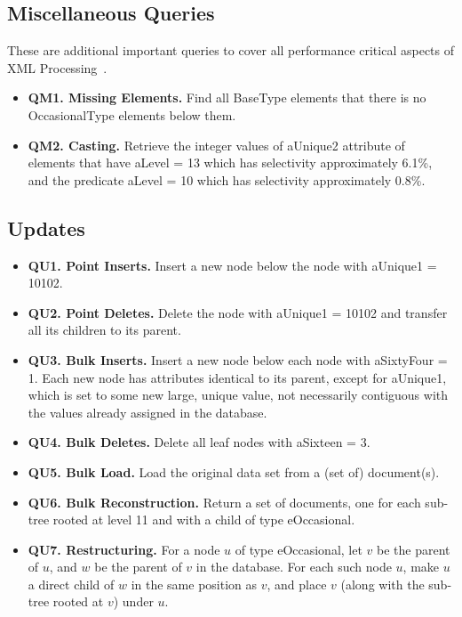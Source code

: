 \subsection{Miscellaneous Queries}
These are additional important queries to cover all performance
critical aspects of XML Processing~\cite{SIGMODRECORD01Bench}.
\begin {itemize}
\item {\bf QM1. Missing Elements.} Find all {\sf BaseType} elements that
there is no {\sf OccasionalType} elements below them.
\item {\bf QM2. Casting.} Retrieve the integer values of {\sf aUnique2}
attribute of elements that have {\sf aLevel = 13} which has selectivity
approximately 6.1\%, and the predicate {\sf aLevel = 10} which has
selectivity approximately 0.8\%.
\end{itemize}

\subsection{Updates}
\begin {itemize}
\item {\bf QU1. Point Inserts.} Insert a new node below the node with
{\sf aUnique1 = 10102}.

\item {\bf QU2. Point Deletes.} Delete the node with
{\sf aUnique1 = 10102} and transfer all its children to its parent.

\item {\bf QU3. Bulk Inserts.} Insert a new node below each node with
{\sf aSixtyFour = 1}.  Each new node has attributes identical to its parent,
except for {\sf aUnique1}, which is set to some new large, unique value, not
necessarily contiguous with the values already assigned in the database.

\item {\bf QU4. Bulk Deletes.} Delete all leaf nodes with {\sf aSixteen = 3}.

\item {\bf QU5. Bulk Load.} Load the original data set from a (set of) document(s).

\item {\bf QU6. Bulk Reconstruction.} Return a set of documents, one for each
sub-tree rooted at level 11 and with a child of type {\sf eOccasional}.

\item {\bf QU7. Restructuring.}
For a node $u$ of type {\sf eOccasional}, let $v$ be the parent of $u$, and
$w$ be the parent of $v$ in the database.  For each such node $u$, make $u$ a
direct child of $w$ in the same position as $v$, and place $v$ (along with
the sub-tree rooted at $v$) under $u$.
\end{itemize}








